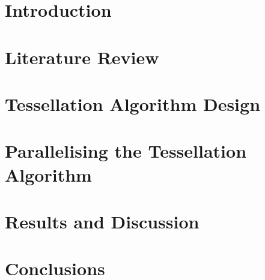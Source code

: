 \documentclass{newrucsthesis}
\begin{document}




\tableofcontents
\listoffigures
\printglossaries
\chapter{Introduction}


\chapter{Literature Review}






\chapter{Tessellation Algorithm Design}







\chapter{Parallelising the Tessellation Algorithm}








\chapter{Results and Discussion}





\chapter{Conclusions}






\end{document}
